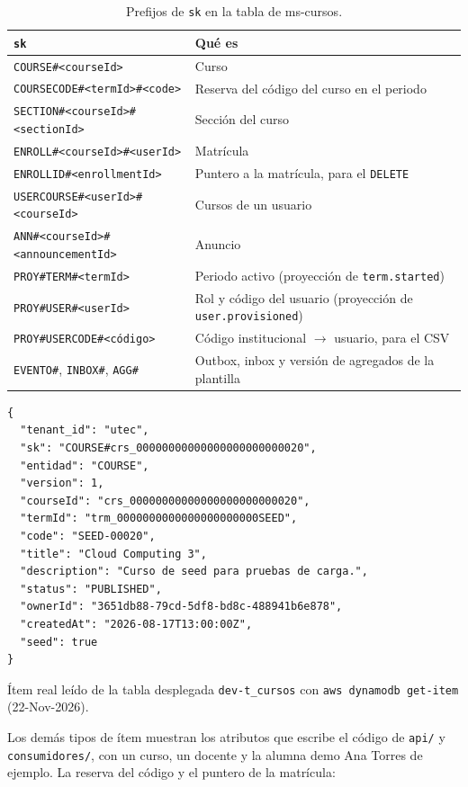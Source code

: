 \begin{table}[htbp]
\centering\small
\begin{tabularx}{\textwidth}{>{\raggedright\arraybackslash}p{}X}
\toprule
\texttt{sk} & Qué es \\
\midrule
\texttt{COURSE\#<courseId>} & Curso \\
\texttt{COURSECODE\#<termId>\#<code>} & Reserva del código del curso en el periodo \\
\texttt{SECTION\#<courseId>\#<sectionId>} & Sección del curso \\
\texttt{ENROLL\#<courseId>\#<userId>} & Matrícula \\
\texttt{ENROLLID\#<enrollmentId>} & Puntero a la matrícula, para el \texttt{DELETE} \\
\texttt{USERCOURSE\#<userId>\#<courseId>} & Cursos de un usuario \\
\texttt{ANN\#<courseId>\#<announcementId>} & Anuncio \\
\texttt{PROY\#TERM\#<termId>} & Periodo activo (proyección de \texttt{term.started}) \\
\texttt{PROY\#USER\#<userId>} & Rol y código del usuario (proyección de \texttt{user.provisioned}) \\
\texttt{PROY\#USERCODE\#<código>} & Código institucional $\rightarrow$ usuario, para el CSV \\
\texttt{EVENTO\#}, \texttt{INBOX\#}, \texttt{AGG\#} & Outbox, inbox y versión de agregados de la plantilla \\
\bottomrule
\end{tabularx}
\caption{Prefijos de \texttt{sk} en la tabla de ms-cursos.}
\end{table}

\begin{lstlisting}
{
  "tenant_id": "utec",
  "sk": "COURSE#crs_00000000000000000000000020",
  "entidad": "COURSE",
  "version": 1,
  "courseId": "crs_00000000000000000000000020",
  "termId": "trm_0000000000000000000000SEED",
  "code": "SEED-00020",
  "title": "Cloud Computing 3",
  "description": "Curso de seed para pruebas de carga.",
  "status": "PUBLISHED",
  "ownerId": "3651db88-79cd-5df8-bd8c-488941b6e878",
  "createdAt": "2026-08-17T13:00:00Z",
  "seed": true
}
\end{lstlisting}
Ítem real leído de la tabla desplegada \texttt{dev-t\_cursos} con \texttt{aws dynamodb get-item} (22-Nov-2026).

Los demás tipos de ítem muestran los atributos que escribe el código de \texttt{api/} y
\texttt{consumidores/}, con un curso, un docente y la alumna demo Ana Torres de ejemplo. La reserva
del código y el puntero de la matrícula:


